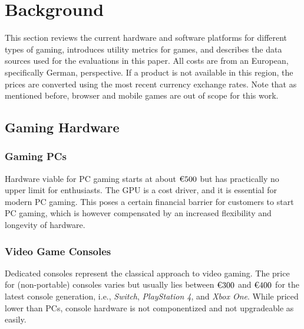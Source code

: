 \section{Background}
\label{sec:background}

This section reviews the current hardware and software platforms
for different types of gaming, introduces utility metrics for games,
and describes the data sources used for the evaluations in this paper.
All costs are from an European, specifically German, perspective. If a
product is not available in this region, the prices are converted using
the most recent currency exchange rates.
Note that as mentioned before, browser and mobile games are out
of scope for this work.




\subsection{Gaming Hardware}

\subsubsection{Gaming \acrshort{PC}s}
Hardware viable for \gls{PC} gaming starts at about $\text{\texteuro} 500$ but
has practically no upper limit for enthusiasts. The \gls{GPU}
is a cost driver, and it is essential for modern \gls{PC} gaming.
This poses a certain financial barrier for customers to start \gls{PC} gaming,
which is however compensated by an increased flexibility and longevity of
hardware.

\subsubsection{Video Game Consoles}
Dedicated consoles represent the classical approach to video gaming.
The price for (non-portable) consoles varies but usually lies between
$\text{\texteuro} 300$ and $\text{\texteuro} 400$ for the latest console
generation, i.e., \textit{Switch}, \textit{PlayStation 4}, and
\textit{Xbox One}.
While priced lower than \glspl{PC}, console hardware is not componentized
and not upgradeable as easily.

